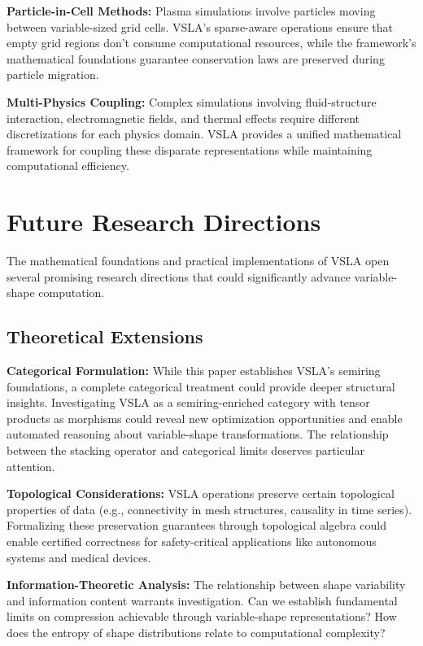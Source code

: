 \documentclass[11pt]{article}
\begin{document}
\textbf{Particle-in-Cell Methods:} Plasma simulations involve particles moving between variable-sized grid cells. VSLA's sparse-aware operations ensure that empty grid regions don't consume computational resources, while the framework's mathematical foundations guarantee conservation laws are preserved during particle migration.

\textbf{Multi-Physics Coupling:} Complex simulations involving fluid-structure interaction, electromagnetic fields, and thermal effects require different discretizations for each physics domain. VSLA provides a unified mathematical framework for coupling these disparate representations while maintaining computational efficiency.

\section{Future Research Directions}
\label{sec:future}

The mathematical foundations and practical implementations of VSLA open several promising research directions that could significantly advance variable-shape computation.

\subsection{Theoretical Extensions}

\textbf{Categorical Formulation:} While this paper establishes VSLA's semiring foundations, a complete categorical treatment could provide deeper structural insights. Investigating VSLA as a semiring-enriched category with tensor products as morphisms could reveal new optimization opportunities and enable automated reasoning about variable-shape transformations. The relationship between the stacking operator and categorical limits deserves particular attention.

\textbf{Topological Considerations:} VSLA operations preserve certain topological properties of data (e.g., connectivity in mesh structures, causality in time series). Formalizing these preservation guarantees through topological algebra could enable certified correctness for safety-critical applications like autonomous systems and medical devices.

\textbf{Information-Theoretic Analysis:} The relationship between shape variability and information content warrants investigation. Can we establish fundamental limits on compression achievable through variable-shape representations? How does the entropy of shape distributions relate to computational complexity?
\end{document}
